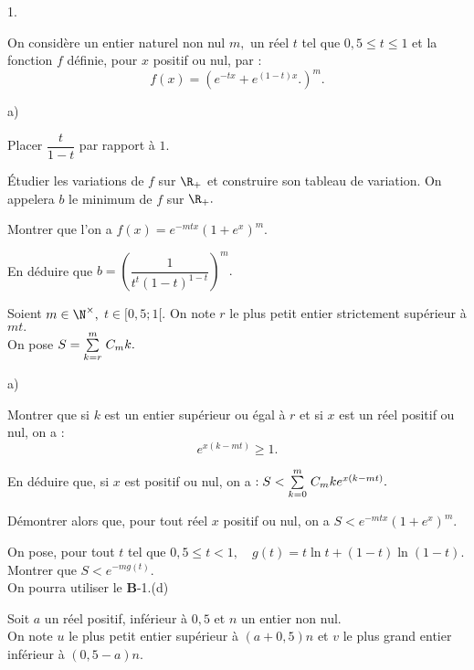 \documentclass[11pt]{article}%
\begin{document}
\begin{noliste}{1.}
 \setlength{\itemsep}{4mm}
\item On considère un entier naturel non nul $m,$ un réel $t$ tel que
$0,5\leq t\leq 1$ et la fonction $f$ définie, pour $x$ positif ou
nul, par :
\[
f(x) = \left( e^{-tx} + e^{(1-t)x}.\right) ^{m}.
\]

\begin{noliste}{a)}
 \setlength{\itemsep}{2mm}
\item Placer $\dfrac{t}{1-t}$ par rapport à $1.$

\item Étudier les variations de $f$ sur $\R_{+}$ et construire son
tableau de variation. On appelera $b$ le minimum de $f$ sur $\R_{+}.$

\item Montrer que l'on a $f(x) = e^{-mtx}(1 + e^{x})^{m}.$

\item En déduire que $b = \left( \dfrac{1}{t^{t}(1-t)^{1-t}}\right)
^{m}.$
\end{noliste}

\item Soient $m\in \N^{\times },$ $t\in \lbrack 0,5;1[.$ On note $r$
le plus petit entier strictement supérieur à $mt.$\\
On pose $S = {\textstyle\sum\limits_{k = r}^{m}}\hspace{.1cm}C_{m}{k}.$

\begin{noliste}{a)}
 \setlength{\itemsep}{2mm}
\item Montrer que si $k$ est un entier supérieur ou égal à $r$ et si
$x$ est
un réel positif ou nul, on a :
\[
e^{x(k-mt)}\geq 1.
\]

\item En déduire que, si $x$ est positif ou nul, on a $ :S<{\textstyle\sum\limits_{k =
0}^{m}}\hspace{.1cm}C_{m}{k}e^{x(k-mt)}.$

\item Démontrer alors que, pour tout réel $x$ positif ou nul, on a
$S<e^{-mtx}(1 + e^{x})^{m}.$

\item On pose, pour tout $t$ tel que $0,5\leq t<1,\quad g(t) = t\ln
t + (1-t)\ln (1-t).$\\
Montrer que $S<e^{-mg(t)}.$\\
On pourra utiliser le \textbf{B}-1.(d)
\end{noliste}

\item Soit $a$ un réel positif, inférieur à $0,5$ et $n$ un entier non
nul.\\
On note $u$ le plus petit entier supérieur à $(a + 0,5)n$ et $v$ le
plus grand
entier inférieur à $(0,5-a)n.$


\end{noliste}
\end{document}
